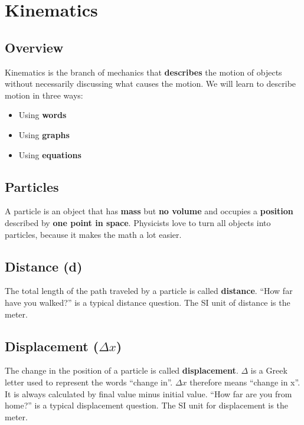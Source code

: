 \section{Kinematics}
	
\subsection{Overview}
		
Kinematics is the branch of mechanics that \textbf{describes} the motion of objects without necessarily discussing what causes the motion. We will learn to describe motion in three ways:
\begin{itemize}
	\item Using \textbf{words}
	\item Using \textbf{graphs}
	\item Using \textbf{equations}
\end{itemize}
	
\subsection{Particles}
A particle is an object that has \textbf{mass} but \textbf{no volume}  and occupies a \textbf{position} described by \textbf{one point in space}. Physicists love to turn all objects into particles, because it makes the math  a lot easier.
	
\subsection{Distance (d)}
The total length of the path traveled by a particle is called \textbf{distance}. “How far have you walked?” is a typical distance question. The SI unit of distance is the meter.
	
\subsection{Displacement ($\Delta x$)}
The change in the position of a particle is called \textbf{displacement}. $\Delta$ is a Greek letter used to represent the words “change in”. $\Delta x$ therefore means “change in x”. It is always calculated by final value minus initial value. “How far are you from home?” is a typical displacement question. The SI unit for displacement is the meter.
	
\newpage

